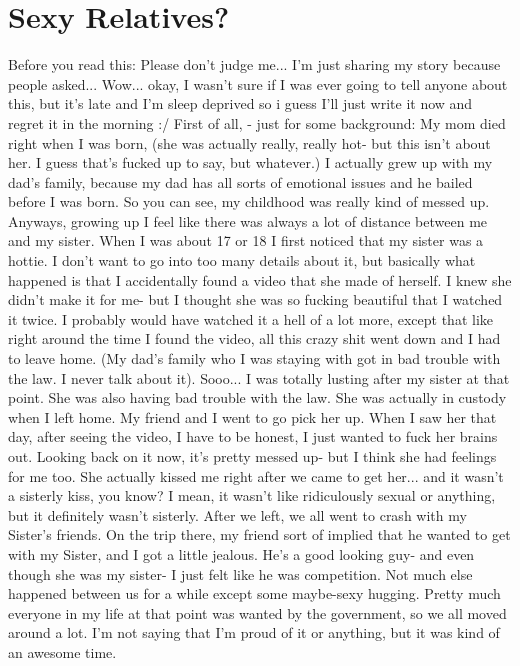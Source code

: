 \documentclass[a4paper]{article}
\begin{document}
\section{Sexy Relatives?}
Before you read this: Please don't judge me... I'm just sharing my story because people asked...
Wow... okay, I wasn't sure if I was ever going to tell anyone about this, but it's late and I'm sleep deprived so i guess I'll just write it now and regret it in the morning :/
First of all, - just for some background: My mom died right when I was born, (she was actually really, really hot- but this isn't about her. I guess that's fucked up to say, but whatever.) I actually grew up with my dad's family, because my dad has all sorts of emotional issues and he bailed before I was born. So you can see, my childhood was really kind of messed up.
Anyways, growing up I feel like there was always a lot of distance between me and my sister. When I was about 17 or 18 I first noticed that my sister was a hottie.
I don't want to go into too many details about it, but basically what happened is that I accidentally found a video that she made of herself. I knew she didn't make it for me- but I thought she was so fucking beautiful that I watched it twice. I probably would have watched it a hell of a lot more, except that like right around the time I found the video, all this crazy shit went down and I had to leave home. (My dad's family who I was staying with got in bad trouble with the law. I never talk about it).
Sooo... I was totally lusting after my sister at that point. She was also having bad trouble with the law. She was actually in custody when I left home.
My friend and I went to go pick her up. When I saw her that day, after seeing the video, I have to be honest, I just wanted to fuck her brains out. Looking back on it now, it's pretty messed up- but I think she had feelings for me too. She actually kissed me right after we came to get her... and it wasn't a sisterly kiss, you know? I mean, it wasn't like ridiculously sexual or anything, but it definitely wasn't sisterly.
After we left, we all went to crash with my Sister's friends. On the trip there, my friend sort of implied that he wanted to get with my Sister, and I got a little jealous. He's a good looking guy- and even though she was my sister- I just felt like he was competition. Not much else happened between us for a while except some maybe-sexy hugging.
Pretty much everyone in my life at that point was wanted by the government, so we all moved around a lot. I'm not saying that I'm proud of it or anything, but it was kind of an awesome time.
\end{document}
